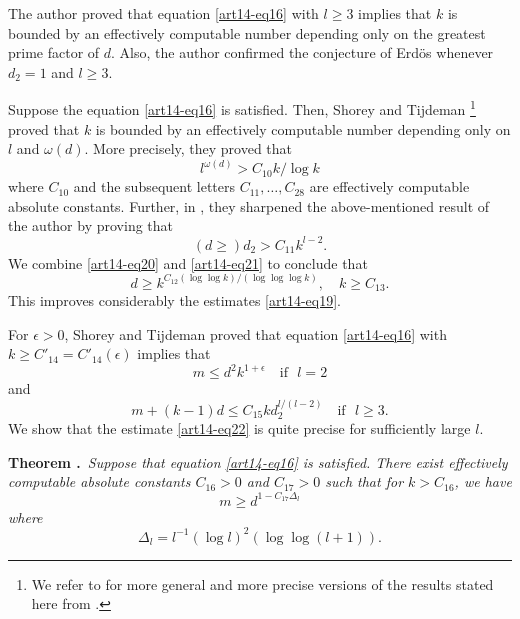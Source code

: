 The author \cite{art14-key27} proved that equation \eqref{art14-eq16} with $l\geq 3$ implies that $k$ is bounded by an effectively computable number depending only on the greatest prime factor of $d$. Also, the author \cite{art14-key27} confirmed the conjecture of Erd\"os whenever $d_{2}=1$ and $l\geq 3$.

Suppose the equation \eqref{art14-eq16} is satisfied. Then, Shorey and Tijdeman \cite{art14-key35}\footnote[1]{We refer to \cite{art14-key35} for more general and more precise versions of the results stated here from \cite{art14-key35}.} proved that $k$ is bounded by an effectively computable number depending only on $l$ and $\omega(d)$. More precisely, they proved that
\begin{equation}
l^{\omega(d)}>C_{10}k/\log k\label{art14-eq20}
\end{equation}\pageoriginale
where $C_{10}$ and the subsequent letters $C_{11},\ldots,C_{28}$ are effectively computable absolute constants. Further, in \cite{art14-key35}, they sharpened the above-mentioned result of the author by proving that
\begin{equation}
(d\geq ) d_{2}>C_{11}k^{l-2}.\label{art14-eq21}
\end{equation}
We combine \eqref{art14-eq20} and \eqref{art14-eq21} to conclude that
$$
d\geq k^{C_{12}(\log \log k)/(\log \log \log k)},\quad k\geq C_{13}.
$$
This improves considerably the estimates \eqref{art14-eq19}.

For $\epsilon>0$, Shorey and Tijdeman \cite{art14-key35} proved that equation \eqref{art14-eq16} with $k\geq C'_{14}=C'_{14}(\epsilon)$ implies that
$$
m\leq d^{2}k^{1+\epsilon}\quad\text{if~ } l=2
$$
and
\begin{equation}
m+(k-1)d\leq C_{15}kd_{2}^{l/(l-2)}\quad\text{if~ } l\geq 3.\label{art14-eq22}
\end{equation}
We show that the estimate \eqref{art14-eq22} is quite precise for sufficiently large $l$.

\medskip
\noindent
{\bf Theorem .\label{art14-thm4}}~{\em Suppose that equation \eqref{art14-eq16} is satisfied. There exist effectively computable absolute constants $C_{16}>0$ and $C_{17}>0$ such that for $k>C_{16}$, we have}
\begin{equation}
m\geq d^{1-C_{17}\Delta_{l}}\label{art14-eq23}
\end{equation}
{\em where}
\begin{equation}
\Delta_{l}=l^{-1}(\log l)^{2}(\log\log (l+1)).\label{art14-eq24}
\end{equation}

